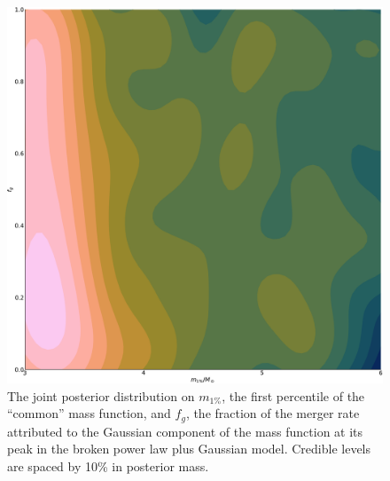 \documentclass[modern]{aastex631}
\begin{document}
\begin{figure}
    \includegraphics[width=\columnwidth]{figures/m1pct-fg-contour.pdf}
    \caption{\label{fig:m1pct-fg-contour} The joint posterior distribution on
    $m_{1\%}$, the first percentile of the ``common'' mass function, and $f_g$,
    the fraction of the merger rate attributed to the Gaussian component of the
    mass function at its peak in the broken power law plus Gaussian model.
    Credible levels are spaced by 10\% in posterior mass.}
\end{figure}

\clearpage


\end{document}
